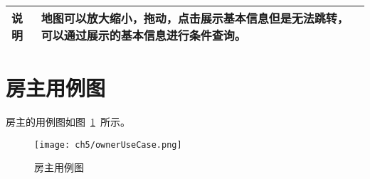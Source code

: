 \begin{table}[htbp]
\begin{tabular}{|l|l|l|l|}
        \hline
        说明                              & \multicolumn{3}{l|}{
        \begin{minipage}[t]{0.8\textwidth}
                地图可以放大缩小，拖动，点击展示基本信息但是无法跳转，可以通过展示的基本信息进行条件查询。
                \vspace{.5em}
            \end{minipage} }                                                                                                                                                                                     \\
        \hline
    \end{tabular}
\end{table}

\section{房主用例图}

房主的用例图如图~\ref{fig:ownerUseCase}~所示。

\begin{figure}[htbp]
    \centering
    \texttt{[image: ch5/ownerUseCase.png]}
    \caption{房主用例图}\label{fig:ownerUseCase}
    \vspace{\baselineskip} %
\end{figure}

